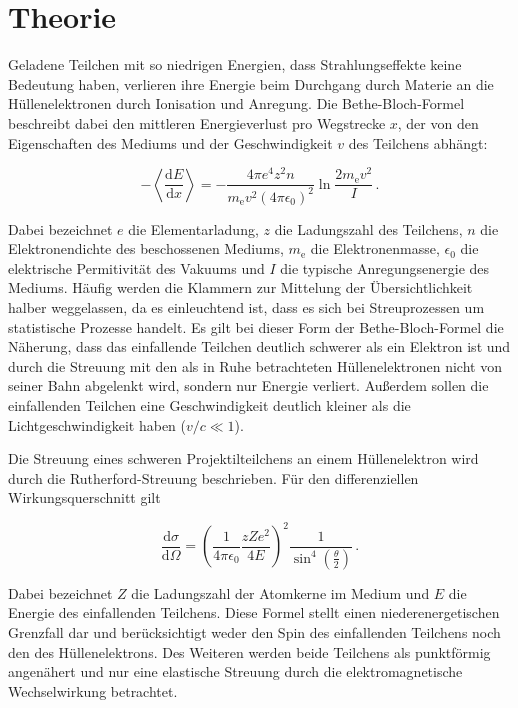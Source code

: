 \section{Theorie}
\label{sec:Theorie}

Geladene Teilchen mit so niedrigen Energien, dass Strahlungseffekte keine Bedeutung haben, verlieren ihre Energie beim Durchgang durch Materie an die Hüllenelektronen durch Ionisation und Anregung. Die Bethe-Bloch-Formel beschreibt dabei den mittleren Energieverlust pro Wegstrecke $x$, der von den Eigenschaften des Mediums und der Geschwindigkeit $v$ des Teilchens abhängt:

\begin{equation}
  -\left<\frac{\mathrm{d}E}{\mathrm{d}x}\right> = - \frac{4\pi e^4 z^2 n}{m_{\mathrm{e}}v^2(4 \pi \epsilon_{\mathrm{0}})^2} \ln{\frac{2 m_{\mathrm{e}} v^2}{I}}\,.
  \label{eqn:bethe}
\end{equation}

Dabei bezeichnet $e$ die Elementarladung, $z$ die Ladungszahl des Teilchens, $n$ die Elektronendichte des beschossenen Mediums, $m_\text{e}$ die Elektronenmasse, $\epsilon_0$ die elektrische Permitivität des Vakuums und $I$ die typische Anregungsenergie des Mediums. Häufig werden die Klammern zur Mittelung der Übersichtlichkeit halber weggelassen, da es einleuchtend ist, dass es sich bei Streuprozessen um statistische Prozesse handelt.
Es gilt bei dieser Form der Bethe-Bloch-Formel die Näherung, dass das einfallende Teilchen deutlich schwerer als ein Elektron ist und durch die Streuung mit den als in Ruhe betrachteten Hüllenelektronen nicht von seiner Bahn abgelenkt wird, sondern nur Energie verliert. Außerdem sollen die einfallenden Teilchen eine Geschwindigkeit deutlich kleiner als die Lichtgeschwindigkeit haben ($v/c \ll 1$).

Die Streuung eines schweren Projektilteilchens an einem Hüllenelektron wird durch die Rutherford-Streuung beschrieben. Für den differenziellen Wirkungsquerschnitt gilt

\begin{equation}
  \frac{\mathrm{d}\sigma}{\mathrm{d}\Omega} = \left( \frac{1}{4\pi\epsilon_0}\frac{z Z e^2}{4 E} \right)^2 \frac{1}{\sin^4\left( \frac{\theta}{2} \right)}\,.
  \label{eqn:rutherford}
\end{equation}

Dabei bezeichnet $Z$ die Ladungszahl der Atomkerne im Medium und $E$ die Energie des einfallenden Teilchens.
Diese Formel stellt einen niederenergetischen Grenzfall dar und berücksichtigt weder den Spin des einfallenden Teilchens noch den des Hüllenelektrons. Des Weiteren werden beide Teilchens als punktförmig angenähert und nur eine elastische Streuung durch die elektromagnetische Wechselwirkung betrachtet.

